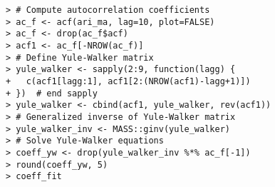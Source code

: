 \documentclass[10pt]{beamer}\usepackage[]{graphicx}\usepackage[]{color}
\makeatletter
\newenvironment{kframe}{%
 \def\at@end@of@kframe{}%
 \ifinner\ifhmode%
  \def\at@end@of@kframe{\end{minipage}}%
  \begin{minipage}{\columnwidth}%
 \fi\fi%
 \def\FrameCommand##1{\hskip\@totalleftmargin \hskip-\fboxsep
 \colorbox{shadecolor}{##1}\hskip-\fboxsep
     \hskip-\linewidth \hskip-\@totalleftmargin \hskip\columnwidth}%
 \MakeFramed {\advance\hsize-\width
   \@totalleftmargin\z@ \linewidth\hsize
   \@setminipage}}%
 {\par\unskip\endMakeFramed%
 \at@end@of@kframe}
\newenvironment{knitrout}{}{} %
\makeatother
\begin{document}
\begin{frame}[fragile,t]{\subsecname}
\begin{block}{}
\begin{columns}[T]
      \vspace{-1em}
\begin{knitrout}\tiny
{}\color{fgcolor}\begin{kframe}
\begin{verbatim}
> # Compute autocorrelation coefficients
> ac_f <- acf(ari_ma, lag=10, plot=FALSE)
> ac_f <- drop(ac_f$acf)
> acf1 <- ac_f[-NROW(ac_f)]
> # Define Yule-Walker matrix
> yule_walker <- sapply(2:9, function(lagg) {
+   c(acf1[lagg:1], acf1[2:(NROW(acf1)-lagg+1)])
+ })  # end sapply
> yule_walker <- cbind(acf1, yule_walker, rev(acf1))
> # Generalized inverse of Yule-Walker matrix
> yule_walker_inv <- MASS::ginv(yule_walker)
> # Solve Yule-Walker equations
> coeff_yw <- drop(yule_walker_inv %*% ac_f[-1])
> round(coeff_yw, 5)
> coeff_fit
\end{verbatim}
\end{kframe}
\end{knitrout}
  \end{columns}
\end{block}

\end{frame}


\end{document}
